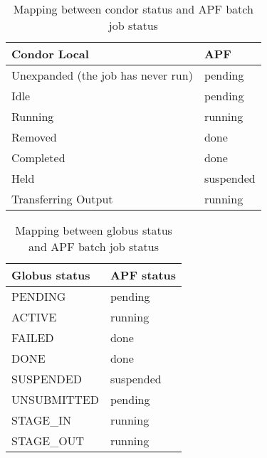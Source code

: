\documentclass[a4paper]{jpconf}
\begin{document}
\begin{table}
   \begin{center}
      \begin{tabular}{l l}
         \hline
         \textbf{Condor Local}   & \textbf{APF}       \\ 
         \hline
         Unexpanded (the job has never run)    &  pending     \\
         Idle                                  &  pending     \\
         Running                               &  running     \\
         Removed                               &  done        \\
         Completed                             &  done        \\
         Held                                  &  suspended   \\
         Transferring Output                   &  running     \\
         \hline
      \end{tabular}
   \end{center}
   \caption{Mapping between condor status and APF batch job status}
   \label{translation}
\end{table}

\begin{table}
   \begin{center}
      \begin{tabular}{l l}
         \hline
         \textbf{Globus status}   & \textbf{APF status}       \\ 
         \hline
         PENDING       &   pending    \\
         ACTIVE        &   running    \\
         FAILED        &   done       \\
         DONE          &   done       \\
         SUSPENDED     &   suspended  \\
         UNSUBMITTED   &   pending    \\
         STAGE\_IN     &   running    \\
         STAGE\_OUT    &   running    \\
         \hline
      \end{tabular}
   \end{center}
   \caption{Mapping between globus status and APF batch job status}
   \label{translation}
\end{table}
\end{document}

